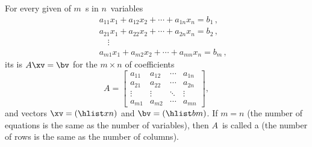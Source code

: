 \begin{definition} \label{def:matvecsys}
For every given  of \(m\)~s in \(n\)~variables
\begin{eqnarray*}
&&a_{11}x_1+a_{12}x_2+\cdots+a_{1n}x_n=b_1\,,
\\&&a_{21}x_1+a_{22}x_2+\cdots+a_{2n}x_n=b_2\,,
\\&&\quad\vdots
\\&&a_{m1}x_1+a_{m2}x_2+\cdots+a_{mn}x_n=b_m\,,
\end{eqnarray*}
its  is \(A\xv=\bv\) for the \(m\times n\)  of coefficients
\begin{equation*}
A=\begin{bmatrix} a_{11}&a_{12}&\cdots&a_{1n}
\\a_{21}&a_{22}&\cdots&a_{2n}
\\\vdots&\vdots&\ddots&\vdots
\\a_{m1}&a_{m2}&\cdots&a_{mn} \end{bmatrix},
\end{equation*}
and vectors \(\xv=(\hlist xn)\) and \(\bv=(\hlist bm)\).
If \(m=n\) (the number of equations is the same as the number of variables), then \(A\)~is called a  (the number of rows is the same as the number of columns).
\end{definition}


